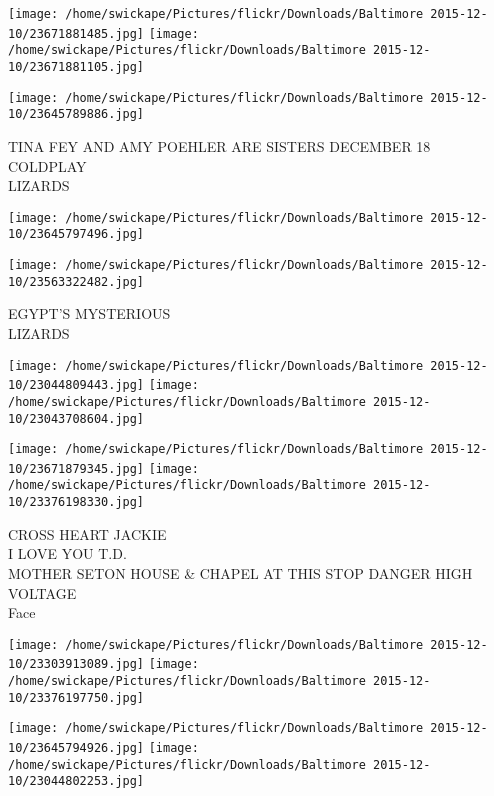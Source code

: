 \documentclass[10pt,letterpaper]{article}
\begin{document}
\texttt{[image: /home/swickape/Pictures/flickr/Downloads/Baltimore 2015-12-10/23671881485.jpg]}
\texttt{[image: /home/swickape/Pictures/flickr/Downloads/Baltimore 2015-12-10/23671881105.jpg]}

\vspace{0.25in}
\texttt{[image: /home/swickape/Pictures/flickr/Downloads/Baltimore 2015-12-10/23645789886.jpg]}

TINA FEY AND AMY POEHLER ARE SISTERS DECEMBER 18\\
COLDPLAY\\
LIZARDS\\
\pagebreak

\texttt{[image: /home/swickape/Pictures/flickr/Downloads/Baltimore 2015-12-10/23645797496.jpg]}

\vspace{0.25in}
\texttt{[image: /home/swickape/Pictures/flickr/Downloads/Baltimore 2015-12-10/23563322482.jpg]}

EGYPT'S MYSTERIOUS\\
LIZARDS\\
\pagebreak

\texttt{[image: /home/swickape/Pictures/flickr/Downloads/Baltimore 2015-12-10/23044809443.jpg]}
\texttt{[image: /home/swickape/Pictures/flickr/Downloads/Baltimore 2015-12-10/23043708604.jpg]}

\texttt{[image: /home/swickape/Pictures/flickr/Downloads/Baltimore 2015-12-10/23671879345.jpg]}
\texttt{[image: /home/swickape/Pictures/flickr/Downloads/Baltimore 2015-12-10/23376198330.jpg]}

CROSS HEART JACKIE\\
I LOVE YOU T.D.\\
MOTHER SETON HOUSE \& CHAPEL AT THIS STOP DANGER HIGH VOLTAGE\\
Face\\
\pagebreak

\texttt{[image: /home/swickape/Pictures/flickr/Downloads/Baltimore 2015-12-10/23303913089.jpg]}
\texttt{[image: /home/swickape/Pictures/flickr/Downloads/Baltimore 2015-12-10/23376197750.jpg]}

\texttt{[image: /home/swickape/Pictures/flickr/Downloads/Baltimore 2015-12-10/23645794926.jpg]}
\texttt{[image: /home/swickape/Pictures/flickr/Downloads/Baltimore 2015-12-10/23044802253.jpg]}
\end{document}
